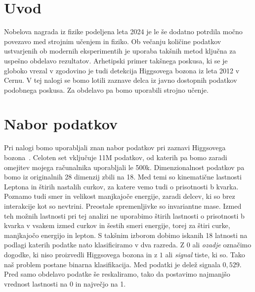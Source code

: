\documentclass[notoc]{porocilo}
\begin{document}
\maketitle
\section{Uvod}
Nobelova nagrada iz fizike podeljena leta 2024 je le še dodatno potrdila močno povezavo med strojnim učenjem in fiziko. Ob večanju količine podatkov ustvarjenih ob modernih eksperimentih je uporaba takšnih metod ključna za uspešno obdelavo rezultatov. Arhetipski primer takšnega poskusa, ki se je globoko vrezal v zgodovino je tudi detekcija Higgsovega bozona iz leta 2012 v Cernu. V tej nalogi se bomo lotili zaznave delca iz javno dostopnih podatkov podobnega poskusa. Za obdelavo pa bomo uporabili strojno učenje.

\section{Nabor podatkov}
Pri nalogi bomo uporabljali znan nabor podatkov pri zaznavi Higgsovega bozona~\cite{Higgs2014}. Celoten set vključuje 11M podatkov, od katerih pa bomo zaradi omejitev mojega računalnika uporabljali le 500k. Dimenzionalnost podatkov pa bomo iz originalnih 28 dimenzij zbili na 18. Med temi so kinematične lastnosti Leptona in štirih nastalih curkov, za katere vemo tudi o prisotnosti b kvarka. Poznamo tudi smer in velikost manjkajoče energije, zaradi delcev, ki so brez interakcije kot so nevtrini. Preostale spremenljivke so invariantne mase. Izmed teh možnih lastnosti pri tej analizi ne uporabimo štirih lastnosti o prisotnosti b kvarka v vsakem izmed curkov in šestih smeri energije, torej za štiri curke, manjkajočo energijo in lepton. S takšnim izborom dobimo iskanih 18 latnosti na podlagi katerih podatke nato klasificiramo v dva razreda. Z $0$ ali \textit{ozadje} označimo dogodke, ki niso proizvedli Higgsovega bozona in z $1$ ali \textit{signal} tiste, ki so. Tako naš problem postane binarna klasifikacija. Med podatki je delež signala $0,529$. Pred samo obdelavo podatke še reskaliramo, tako da postavimo najmanjšo vrednost lastnosti na 0 in največjo na 1.

\end{document}
